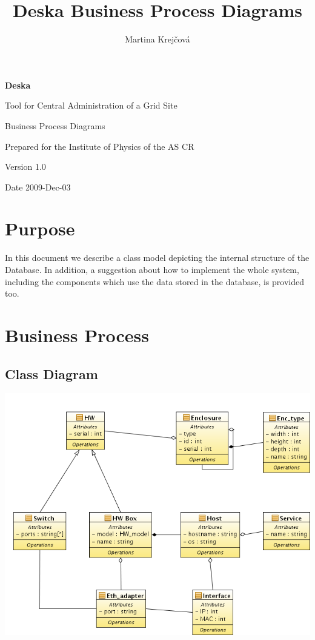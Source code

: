 \documentclass[12pt]{article}
\author{Martina Krejčová}
\title{Deska Business Process Diagrams}
\begin{document}
{\Huge \textbf{Deska}}

\vspace{0.2in}

{\large Tool for Central Administration of a Grid Site}

\vspace{0.5in}

{\large Business Process Diagrams}

\vspace{0.2in}

{\large Prepared for the Institute of Physics of the AS CR}

\vspace{0.2in}

{\large Version 1.0}

\vspace{0.2in}

{\large Date 2009-Dec-03}

\vspace{0.5in}

\tableofcontents

\newpage


\section{Purpose}
In this document we describe a class model depicting the internal structure of
the Database.  In addition, a suggestion about how to implement the whole
system, including the components which use the data stored in the database, is
provided too.


\section{Business Process}

\subsection{Class Diagram}
\includegraphics[width=14cm]{class_diagram.png}
\end{document}
